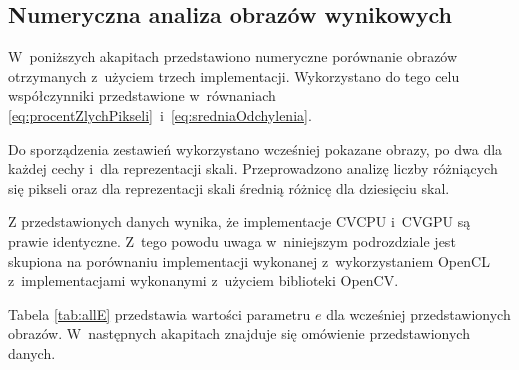 \subsection{Numeryczna analiza obrazów wynikowych}
\label{subsec:porownanieNumerycznePoprawnosc}

W~poniższych akapitach przedstawiono numeryczne porównanie obrazów otrzymanych z~użyciem trzech implementacji. Wykorzystano do tego celu współczynniki przedstawione w~równaniach \eqref{eq:procentZlychPikseli}~i~\eqref{eq:sredniaOdchylenia}.

Do sporządzenia zestawień wykorzystano wcześniej pokazane obrazy, po dwa dla każdej cechy i~dla reprezentacji skali. Przeprowadzono analizę liczby różniących się pikseli oraz dla reprezentacji skali średnią różnicę dla dziesięciu skal. 

Z przedstawionych danych wynika, że implementacje CVCPU i~CVGPU są prawie identyczne. Z~tego powodu uwaga w~niniejszym podrozdziale jest skupiona na porównaniu implementacji wykonanej z~wykorzystaniem OpenCL z~implementacjami wykonanymi z~użyciem biblioteki OpenCV.

Tabela \ref{tab:allE} przedstawia wartości parametru $ e $ dla wcześniej przedstawionych obrazów. W~następnych akapitach znajduje się omówienie przedstawionych danych.

